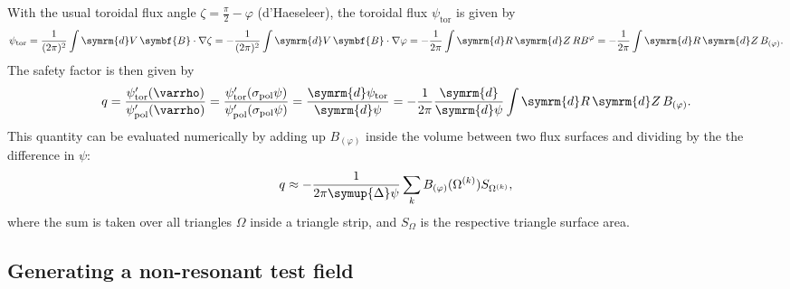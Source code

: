 \documentclass[a4paper, 10pt, english]{article}
\let\temp\varrho
\let\varrho\rho
\let\rho\temp
\let\temp\vartheta
\let\vartheta\theta
\let\theta\temp
\let\temp\varphi
\let\varphi\phi
\let\phi\temp
\let\vec\symbf
\newcommand*\diff{\ensuremath{\symrm{d}}}  %
\newcommand*\td[2][]{\ensuremath{\frac{\diff #1}{\diff #2}}}  %
\newcommand*\pol{\ensuremath{\textrm{pol}}}  %
\newcommand*\tor{\ensuremath{\textrm{tor}}}  %
\begin{document}
With the usual toroidal flux angle $\zeta = \frac{\pi}{2} - \phi$ (d'Haeseleer), the toroidal flux $\psi_{\tor}$ is given by
\begin{gather}
  \psi_{\tor} = \frac{1}{(2 \pi)^{2}} \int \diff V \, \vec{B} \cdot \nabla \zeta = -\frac{1}{(2 \pi)^{2}} \int \diff V \, \vec{B} \cdot \nabla \phi = -\frac{1}{2 \pi} \int \diff R \, \diff Z \, R B^{\phi} = -\frac{1}{2 \pi} \int \diff R \, \diff Z \, B_{(\phi)}.
\end{gather}
The safety factor is then given by
\begin{gather*}
  q = \frac{\psi_{\tor}' (\rho)}{\psi_{\pol}' (\rho)} = \frac{\psi_{\tor}' (\sigma_{\pol} \psi)}{\psi_{\pol}' (\sigma_{\pol} \psi)} = \td[\psi_{\tor}]{\psi} = -\frac{1}{2 \pi} \td{\psi} \int \diff R \, \diff Z \, B_{(\phi)}.
\end{gather*}
This quantity can be evaluated numerically by adding up $B_{(\phi)}$ inside the volume between two flux surfaces and dividing by the the difference in $\psi$:
\begin{gather}
  q \approx -\frac{1}{2 \pi \symup{\Delta} \psi} \sum_{k} B_{(\phi)} (\Omega^{(k)}) S_{\Omega^{(k)}},
\end{gather}
where the sum is taken over all triangles $\Omega$ inside a triangle strip, and $S_{\Omega}$ is the respective triangle surface area.

\subsection{Generating a non-resonant test field}
\end{document}
